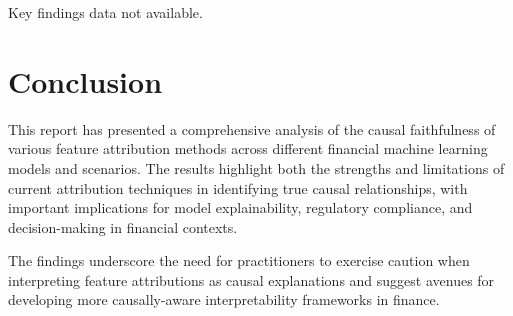 \documentclass{article}
\begin{document}
Key findings data not available.

\section{Conclusion}

This report has presented a comprehensive analysis of the causal faithfulness of various feature attribution methods across different financial machine learning models and scenarios. The results highlight both the strengths and limitations of current attribution techniques in identifying true causal relationships, with important implications for model explainability, regulatory compliance, and decision-making in financial contexts.

The findings underscore the need for practitioners to exercise caution when interpreting feature attributions as causal explanations and suggest avenues for developing more causally-aware interpretability frameworks in finance.
\end{document}
